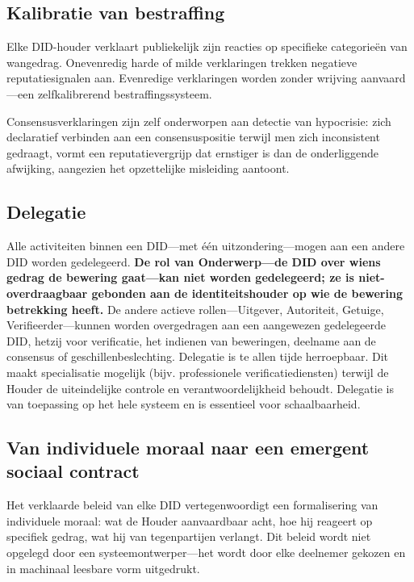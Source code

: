 \documentclass[11pt,a4paper,twocolumn]{article}
\begin{document}
\subsection{Kalibratie van bestraffing}

Elke DID-houder verklaart publiekelijk zijn reacties op specifieke categorieën van wangedrag. Onevenredig harde of milde verklaringen trekken negatieve reputatiesignalen aan. Evenredige verklaringen worden zonder wrijving aanvaard---een zelfkalibrerend bestraffingssysteem.

Consensusverklaringen zijn zelf onderworpen aan detectie van hypocrisie: zich declaratief verbinden aan een consensuspositie terwijl men zich inconsistent gedraagt, vormt een reputatievergrijp dat ernstiger is dan de onderliggende afwijking, aangezien het opzettelijke misleiding aantoont.

\subsection{Delegatie}

Alle activiteiten binnen een DID---met één uitzondering---mogen aan een andere DID worden gedelegeerd. \textbf{De rol van Onderwerp---de DID over wiens gedrag de bewering gaat---kan niet worden gedelegeerd; ze is niet-overdraagbaar gebonden aan de identiteitshouder op wie de bewering betrekking heeft.} De andere actieve rollen---Uitgever, Autoriteit, Getuige, Verifieerder---kunnen worden overgedragen aan een aangewezen gedelegeerde DID, hetzij voor verificatie, het indienen van beweringen, deelname aan de consensus of geschillenbeslechting. Delegatie is te allen tijde herroepbaar. Dit maakt specialisatie mogelijk (bijv. professionele verificatiediensten) terwijl de Houder de uiteindelijke controle en verantwoordelijkheid behoudt. Delegatie is van toepassing op het hele systeem en is essentieel voor schaalbaarheid.

\subsection{Van individuele moraal naar een emergent sociaal contract}

Het verklaarde beleid van elke DID vertegenwoordigt een formalisering van individuele moraal: wat de Houder aanvaardbaar acht, hoe hij reageert op specifiek gedrag, wat hij van tegenpartijen verlangt. Dit beleid wordt niet opgelegd door een systeemontwerper---het wordt door elke deelnemer gekozen en in machinaal leesbare vorm uitgedrukt.
\end{document}
